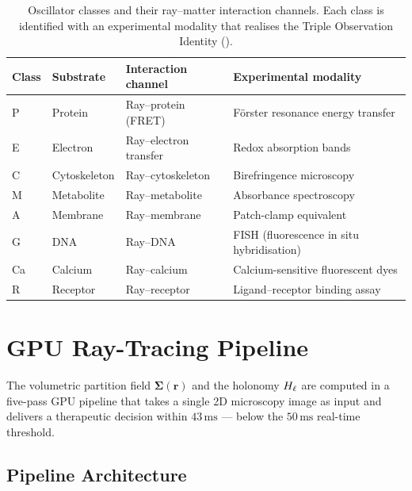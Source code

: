 \begin{table}[!htbp]
\centering
\caption{Oscillator classes and their ray--matter interaction channels.
Each class is identified with an experimental modality that realises the
Triple Observation Identity ().}
\label{tab:oscillator-ray}
\begin{tabular}{@{}llll@{}}
\toprule
Class & Substrate & Interaction channel & Experimental modality \\
\midrule
P  & Protein       & Ray--protein (FRET)          & F\"{o}rster resonance energy transfer \\
E  & Electron      & Ray--electron transfer        & Redox absorption bands \\
C  & Cytoskeleton  & Ray--cytoskeleton             & Birefringence microscopy \\
M  & Metabolite    & Ray--metabolite               & Absorbance spectroscopy \\
A  & Membrane      & Ray--membrane                 & Patch-clamp equivalent \\
G  & DNA           & Ray--DNA                      & FISH (fluorescence in situ hybridisation) \\
Ca & Calcium       & Ray--calcium                  & Calcium-sensitive fluorescent dyes \\
R  & Receptor      & Ray--receptor                 & Ligand--receptor binding assay \\
\bottomrule
\end{tabular}
\end{table}

\section{GPU Ray-Tracing Pipeline}
\label{sec:gpu-pipeline}

The volumetric partition field $\boldsymbol{\Sigma}(\mathbf{r})$ and the
holonomy $H_\ell$ are computed in a five-pass GPU pipeline that takes a single
2D microscopy image as input and delivers a therapeutic decision within
$43\,\mathrm{ms}$ — below the $50\,\mathrm{ms}$ real-time threshold.

\subsection{Pipeline Architecture}


